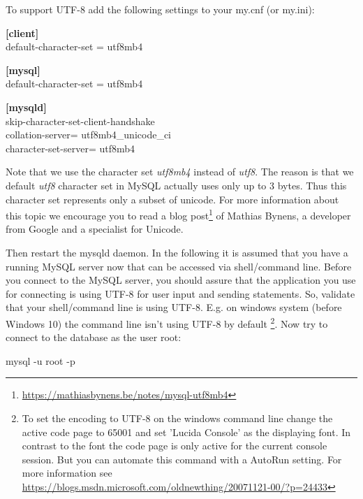 To support UTF-8 add the following settings to your my.cnf (or my.ini):

\begin{codebox}
\textbf{[client]}\\
\noindent\hspace*{4mm}  default-character-set = utf8mb4

\textbf{[mysql]}\\
\noindent\hspace*{4mm}  default-character-set = utf8mb4

\textbf{[mysqld]}\\
\noindent\hspace*{4mm}  skip-character-set-client-handshake\\
\noindent\hspace*{4mm}  collation-server= utf8mb4\_unicode\_ci\\
\noindent\hspace*{4mm}  character-set-server= utf8mb4\\
\end{codebox}

Note that we use the character set \emph{utf8mb4} instead of \emph{utf8}. The reason is that we default \emph{utf8} character set in MySQL actually uses only up to 3 bytes. Thus this character set represents only a subset of unicode. For more information about this topic we encourage you to read a blog post\footnote{\url{https://mathiasbynens.be/notes/mysql-utf8mb4}} of Mathias Bynens, a developer from Google and a specialist for Unicode.

Then restart the mysqld daemon. In the following it is assumed that you have a running MySQL server now that can be accessed via shell/command line. Before you connect to the MySQL server, you should assure that the application you use for connecting is using UTF-8 for user input and sending statements. So, validate that your shell/command line is using UTF-8. E.g. on windows system (before Windows 10) the command line isn't using UTF-8 by default
\footnote{To set the encoding to UTF-8 on the windows command line change the active code page to 65001 and set 'Lucida Console' as the displaying font. In contrast to the font the code page is only active for the current console session. But you can automate this command with a AutoRun setting. For more information see \url{https://blogs.msdn.microsoft.com/oldnewthing/20071121-00/?p=24433}}.  
Now try to connect to the database as the user root:

\begin{codebox}
	mysql -u root -p 
\end{codebox}

